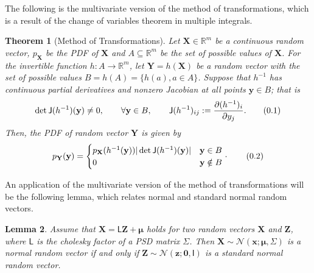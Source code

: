 \documentclass[10pt]{article}
\newtheorem{thm}{Theorem}[section]
\newtheorem{lem}[thm]{Lemma}
\theoremstyle{definition}
\newcommand\eqnum{\addtocounter{equation}{1}\tag{\arabic{section}.\arabic{equation}}}
\begin{document}
The following is the multivariate version of the method of transformations, which is a result of the change of variables theorem in multiple integrals.
\begin{thm}[Method of Transformations]\label{thm:MT:MV}
Let $\mathbf{X}\in\mathbb{R}^m$ be a continuous random vector, $p_\mathbf{X}$ be the PDF of $\mathbf{X}$ and $A\subseteq\mathbb{R}^m$ be the set of possible values of $\mathbf{X}$. For the invertible function $h:A\to\mathbb{R}^m$, let $\mathbf{Y}=h(\mathbf{X})$ be a random vector with the set of possible values $B=h(A)=\{h(a), a\in A\}$. Suppose that $h^{-1}$ has continuous partial derivatives and nonzero Jacobian at all points $\mathbf{y}\in B$; that is
\begin{equation*}
\det\mathsf{J}(h^{-1})(\mathbf{y})\ne 0, \qquad \forall \mathbf{y}\in B, \qquad \mathsf{J}(h^{-1})_{ij} := \frac{\partial (h^{-1})_i}{\partial y_j}.
\eqnum
\end{equation*}
Then, the PDF of random vector $\mathbf{Y}$ is given by
\begin{equation*}
p_{\mathbf{Y}}(\mathbf{y}) = 
\begin{cases}
p_{\mathbf{X}}(h^{-1}(\mathbf{y})) |\det\mathsf{J}(h^{-1})(\mathbf{y})| & \mathbf{y} \in B \\
0 & \mathbf{y} \notin B
\end{cases}
\cdot
\eqnum
\end{equation*}
\end{thm}
An application of the multivariate version of the method of transformations will be the following lemma, which relates normal and standard normal random vectors.
\begin{lem}
Assume that $\mathbf{X}=\mathsf{L}\mathbf{Z}+\boldsymbol{\mu}$ holds for two random vectors $\mathbf{X}$ and $\mathbf{Z}$, where $\mathsf{L}$ is the cholesky factor of a PSD matrix $\mathsf{\Sigma}$. Then $\mathbf{X}\sim\mathcal{N}(\mathbf{x};\boldsymbol{\mu},\mathsf{\Sigma})$ is a normal random vector if and only if $\mathbf{Z}\sim\mathcal{N}(\mathbf{z};\mathbf{0},\mathsf{I})$ is a standard normal random vector.
\end{lem}
\end{document}

